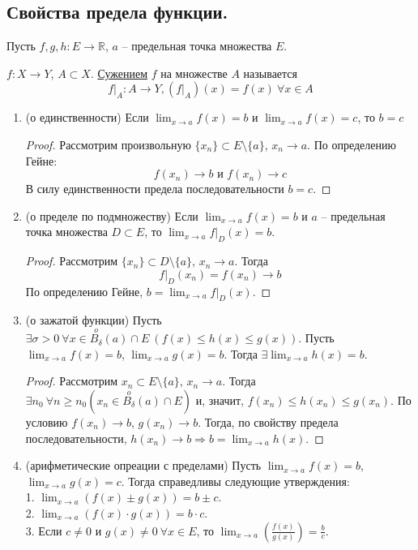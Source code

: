 \subsection{Свойства предела функции.}
Пусть $f,g,h: E \longrightarrow \mathds{R}$, $a$ -- предельная точка множества $E$.

\begin{definition}
    $f: X \longrightarrow Y$, $A \subset X$. \underline{Сужением} $f$ на множестве $A$ называется
    \[f|_{A}: A \longrightarrow Y, (f|_{A})(x) = f(x) \ \forall x \in A\]
\end{definition}

\begin{enumerate}
    \item (о единственности) Если $\lim_{x \rightarrow a} f(x) = b$ и $\lim_{x \rightarrow a} f(x) = c$, то $b = c$
    \begin{proof}
        Рассмотрим произвольную $\{x_{n}\} \subset E \setminus \{a\}$, $x_{n} \rightarrow a$. По определению Гейне:
        \[f(x_{n}) \rightarrow b \text{ и } f(x_{n}) \rightarrow c\]
        В силу единственности предела последовательности $b = c$.
    \end{proof}
    \item (о пределе по подмножеству) Если $\lim_{x \rightarrow a} f(x) = b$ и $a$ -- предельная точка множества $D \subset E$, то $\lim_{x \rightarrow a} f|_{D}(x) = b$.
    \begin{proof}
        Рассмотрим $\{x_{n}\} \subset D \setminus \{a\}$, $x_{n} \rightarrow a$. Тогда
        \[f|_{D}(x_{n}) = f(x_{n}) \rightarrow b\]
        По определению Гейне, $b = \lim_{x \rightarrow a} f|_{D}(x)$.
    \end{proof}
    \item (о зажатой функции) Пусть $\exists \sigma > 0 \ \forall x \in \overset{o}{B_{\delta}} (a) \cap E \ (f(x) \leq h(x) \leq g(x))$. Пусть $\lim_{x \rightarrow a} f(x) = b$, $\lim_{x \rightarrow a} g(x) = b$. Тогда $\exists \lim_{x \rightarrow a} h(x) = b$.
    \begin{proof}
        Рассмотрим $x_{n} \subset E \setminus \{a\}$, $x_{n} \rightarrow a$. Тогда $\exists n_{0} \ \forall n \geq n_{0} (x_{n} \in \overset{o}{B_{\delta}}(a) \cap E)$ и, значит, $f(x_{n}) \leq h(x_{n}) \leq g(x_{n})$. По условию $f(x_{n}) \rightarrow b$, $g(x_{n}) \rightarrow b$. Тогда, по свойству предела последовательности, $h(x_{n}) \rightarrow b \Rightarrow b = \lim_{x \rightarrow a} h(x)$.
    \end{proof}
    \item (арифметические опреации с пределами) Пусть $\lim_{x \rightarrow a} f(x) = b$, $\lim_{x \rightarrow a} g(x) = c$. Тогда справедливы следующие утверждения:
    \\
    1. $\lim_{x \rightarrow a} (f(x) \pm g(x)) = b \pm c$.
    \\
    2. $\lim_{x \rightarrow a} (f(x) \cdot g(x)) = b \cdot c$.
    \\
    3. Если $c \neq 0$ и $g(x) \neq 0 \ \forall x \in E$, то $\lim_{x \rightarrow a} (\frac{f(x)}{g(x)}) = \frac{b}{c}$.
    

\end{enumerate}
